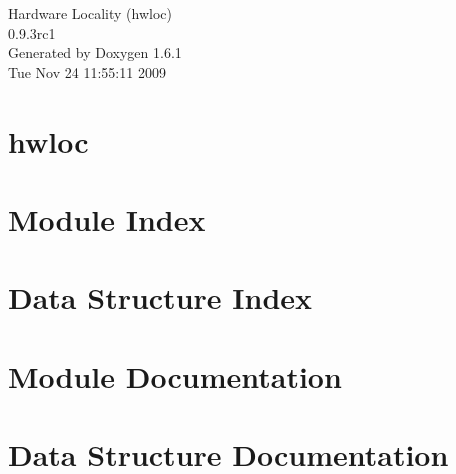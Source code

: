 \documentclass[letterpaper]{book}
\begin{document}
\hypersetup{pageanchor=false}
\begin{titlepage}
\vspace*{7cm}
\begin{center}
{\Large Hardware Locality (hwloc) \\[1ex]\large 0.9.3rc1 }\\
\vspace*{1cm}
{\large Generated by Doxygen 1.6.1}\\
\vspace*{0.5cm}
{\small Tue Nov 24 11:55:11 2009}\\
\end{center}
\end{titlepage}
\clearemptydoublepage
{}
\tableofcontents
\clearemptydoublepage
{}
\hypersetup{pageanchor=true}
\chapter{hwloc}
\label{index}\hypertarget{index}{}
\chapter{Module Index}

\chapter{Data Structure Index}

\chapter{Module Documentation}
























\chapter{Data Structure Documentation}






\printindex
\end{document}
